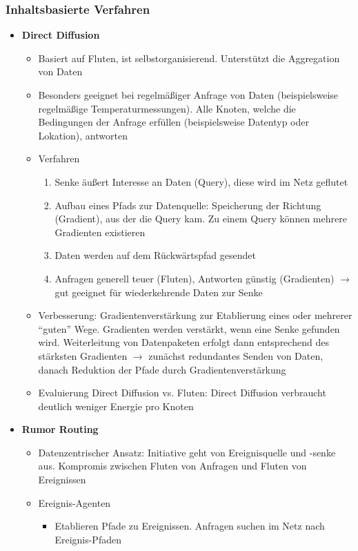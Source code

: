 \subsubsection{Inhaltsbasierte Verfahren}
\begin{itemize}
	\item \textbf{Direct Diffusion}
	\begin{itemize}
		\item Basiert auf Fluten, ist selbstorganisierend. Unterstützt die Aggregation von Daten
		\item Besonders geeignet bei regelmäßiger Anfrage von Daten (beispielsweise regelmäßige Temperaturmessungen). Alle Knoten, welche die Bedingungen der Anfrage erfüllen (beispielsweise Datentyp oder Lokation), antworten
		\item Verfahren
		\begin{enumerate}
			\item Senke äußert Interesse an Daten (Query), diese wird im Netz geflutet
			\item Aufbau eines Pfads zur Datenquelle: Speicherung der Richtung (Gradient), aus der die Query kam. Zu einem Query können mehrere Gradienten existieren
			\item Daten werden auf dem Rückwärtspfad gesendet
			\item Anfragen generell teuer (Fluten), Antworten günstig (Gradienten) \(\rightarrow\) gut geeignet für wiederkehrende Daten zur Senke
		\end{enumerate}
		\item Verbesserung: Gradientenverstärkung zur Etablierung eines oder mehrerer "`guten"' Wege. Gradienten werden verstärkt, wenn eine Senke gefunden wird. Weiterleitung von Datenpaketen erfolgt dann entsprechend des stärksten Gradienten \(\rightarrow\) zunächst redundantes Senden von Daten, danach Reduktion der Pfade durch Gradientenverstärkung
		\item Evaluierung Direct Diffusion vs. Fluten: Direct Diffusion verbraucht deutlich weniger Energie pro Knoten
	\end{itemize}
	\item \textbf{Rumor Routing}
	\begin{itemize}
		\item Datenzentrischer Ansatz: Initiative geht von Ereignisquelle und -senke aus. Kompromis zwischen Fluten von Anfragen und Fluten von Ereignissen
		\item Ereignis-Agenten
		\begin{itemize}
			\item Etablieren Pfade zu Ereignissen. Anfragen suchen im Netz nach Ereignis-Pfaden

\end{itemize}
\end{itemize}
\end{itemize}

